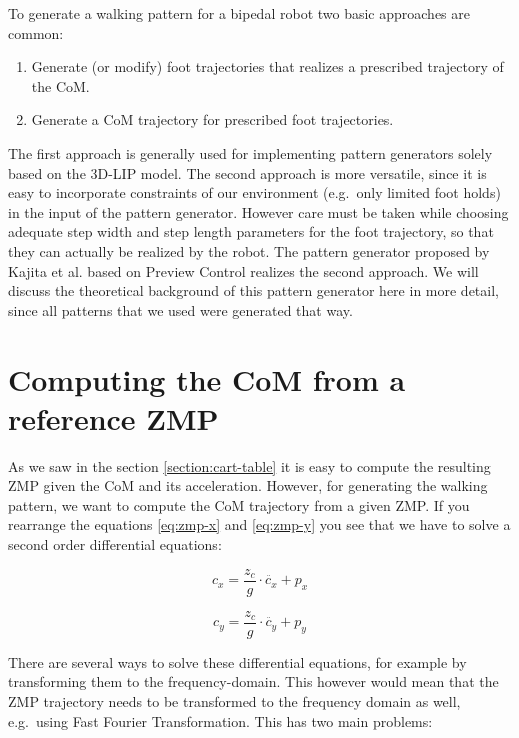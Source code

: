 \documentclass[english,ngerman]{KITreprt}
\begin{document}
To generate a walking pattern for a bipedal robot two basic approaches
are common:

\begin{enumerate}
\def\labelenumi{\arabic{enumi}.}
\item
  Generate (or modify) foot trajectories that realizes a prescribed
  trajectory of the CoM.
\item
  Generate a CoM trajectory for prescribed foot trajectories.
\end{enumerate}

The first approach is generally used for implementing pattern generators
solely based on the 3D-LIP model. \cite{kajita20013d} The second
approach is more versatile, since it is easy to incorporate constraints
of our environment (e.g.~only limited foot holds) in the input of the
pattern generator. However care must be taken while choosing adequate
step width and step length parameters for the foot trajectory, so that
they can actually be realized by the robot. The pattern generator
proposed by Kajita et al. \cite{kajita2003biped} based on Preview
Control realizes the second approach. We will discuss the theoretical
background of this pattern generator here in more detail, since all
patterns that we used were generated that way.

\section{Computing the CoM from a reference
ZMP}\label{computing-the-com-from-a-reference-zmp}

As we saw in the section \ref{section:cart-table} it is easy to compute
the resulting ZMP given the CoM and its acceleration. However, for
generating the walking pattern, we want to compute the CoM trajectory
from a given ZMP. If you rearrange the equations \ref{eq:zmp-x} and
\ref{eq:zmp-y} you see that we have to solve a second order differential
equations:

\begin{equation} \label{eq:com-x}
c_x = \frac{z_c}{g} \cdot \ddot{c_x} + p_x
\end{equation}

\begin{equation} \label{eq:com-y}
c_y = \frac{z_c}{g} \cdot \ddot{c_y} + p_y
\end{equation}

There are several ways to solve these differential equations, for
example by transforming them to the frequency-domain. This however would
mean that the ZMP trajectory needs to be transformed to the frequency
domain as well, e.g.~using Fast Fourier Transformation. This has two
main problems:
\end{document}
